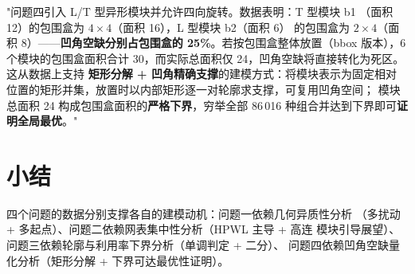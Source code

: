\documentclass[12pt,a4paper]{article}
\begin{document}
"问题四引入 L/T 型异形模块并允许四向旋转。数据表明：T 型模块 b1
（面积 12）的包围盒为 $4\times4$（面积 16），L 型模块 b2（面积 6）
的包围盒为 $2\times4$（面积 8）——\textbf{凹角空缺分别占包围盒的
25\%}。若按包围盒整体放置（bbox 版本），6 个模块的包围盒面积合计
30，而实际总面积仅 24，凹角空缺将直接转化为死区。这从数据上支持
\textbf{矩形分解 + 凹角精确支撑}的建模方式：将模块表示为固定相对
位置的矩形并集，放置时以内部矩形逐一对轮廓求支撑，可复用凹角空间；
模块总面积 24 构成包围盒面积的\textbf{严格下界}，穷举全部
86\,016 种组合并达到下界即可\textbf{证明全局最优}。"

\section{小结}

四个问题的数据分别支撑各自的建模动机：问题一依赖几何异质性分析
（多扰动 + 多起点）、问题二依赖网表集中性分析（HPWL 主导 + 高连
模块引导展望）、问题三依赖轮廓与利用率下界分析（单调判定 + 二分）、
问题四依赖凹角空缺量化分析（矩形分解 + 下界可达最优性证明）。
\end{document}
